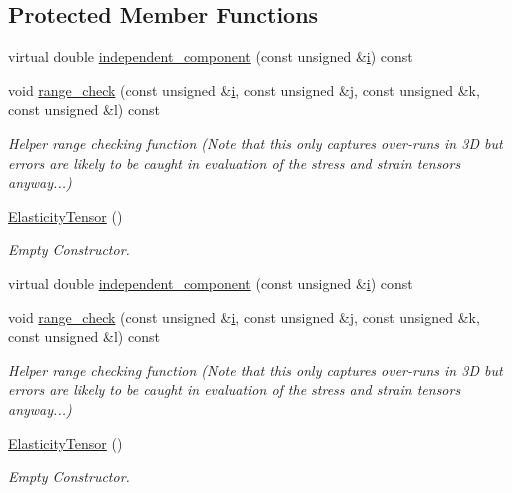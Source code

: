 \subsection*{Protected Member Functions}
\begin{DoxyCompactItemize}
\item 
virtual double \hyperlink{classoomph_1_1ElasticityTensor_a84b2a9b7a447cf88b2d6b98b5e6e7bd5}{independent\+\_\+component} (const unsigned \&\hyperlink{cfortran_8h_adb50e893b86b3e55e751a42eab3cba82}{i}) const
\item 
void \hyperlink{classoomph_1_1ElasticityTensor_ace883403848c5a394cf9cb07861361d1}{range\+\_\+check} (const unsigned \&\hyperlink{cfortran_8h_adb50e893b86b3e55e751a42eab3cba82}{i}, const unsigned \&j, const unsigned \&k, const unsigned \&l) const
\begin{DoxyCompactList}\small\item\em Helper range checking function (Note that this only captures over-\/runs in 3D but errors are likely to be caught in evaluation of the stress and strain tensors anyway...) \end{DoxyCompactList}\item 
\hyperlink{classoomph_1_1ElasticityTensor_a94feb893f8c4180307e18aa341c046b1}{Elasticity\+Tensor} ()
\begin{DoxyCompactList}\small\item\em Empty Constructor. \end{DoxyCompactList}\item 
virtual double \hyperlink{classoomph_1_1ElasticityTensor_a84b2a9b7a447cf88b2d6b98b5e6e7bd5}{independent\+\_\+component} (const unsigned \&\hyperlink{cfortran_8h_adb50e893b86b3e55e751a42eab3cba82}{i}) const
\item 
void \hyperlink{classoomph_1_1ElasticityTensor_ace883403848c5a394cf9cb07861361d1}{range\+\_\+check} (const unsigned \&\hyperlink{cfortran_8h_adb50e893b86b3e55e751a42eab3cba82}{i}, const unsigned \&j, const unsigned \&k, const unsigned \&l) const
\begin{DoxyCompactList}\small\item\em Helper range checking function (Note that this only captures over-\/runs in 3D but errors are likely to be caught in evaluation of the stress and strain tensors anyway...) \end{DoxyCompactList}\item 
\hyperlink{classoomph_1_1ElasticityTensor_a94feb893f8c4180307e18aa341c046b1}{Elasticity\+Tensor} ()
\begin{DoxyCompactList}\small\item\em Empty Constructor. \end{DoxyCompactList}\end{DoxyCompactItemize}
